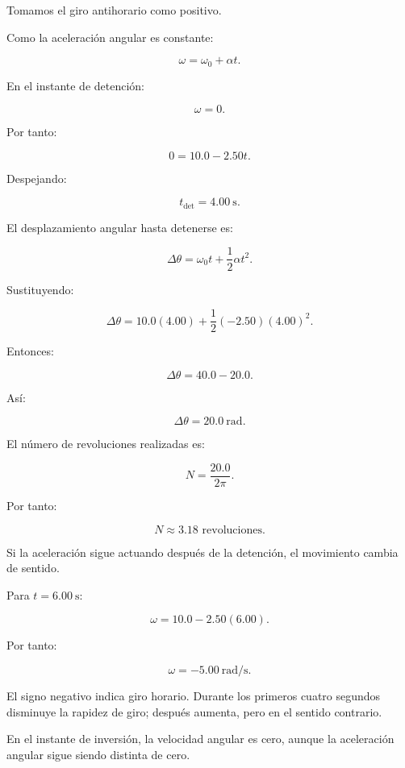 \begin{explicacion}
Tomamos el giro antihorario como positivo.

Como la aceleración angular es constante:

\[
\omega=\omega_0+\alpha t.
\]

En el instante de detención:

\[
\omega=0.
\]

Por tanto:

\[
0=10.0-2.50t.
\]

Despejando:

\[
\boxed{t_{\mathrm{det}}=\SI{4.00}{\second}}.
\]

El desplazamiento angular hasta detenerse es:

\[
\Delta\theta=\omega_0t+\frac12\alpha t^2.
\]

Sustituyendo:

\[
\Delta\theta
=10.0(4.00)+\frac12(-2.50)(4.00)^2.
\]

Entonces:

\[
\Delta\theta=40.0-20.0.
\]

Así:

\[
\boxed{\Delta\theta=\SI{20.0}{\radian}}.
\]

El número de revoluciones realizadas es:

\[
N=\frac{20.0}{2\pi}.
\]

Por tanto:

\[
\boxed{N\approx3.18\text{ revoluciones}}.
\]

Si la aceleración sigue actuando después de la detención,
el movimiento cambia de sentido.

Para \(t=\SI{6.00}{\second}\):

\[
\omega=10.0-2.50(6.00).
\]

Por tanto:

\[
\boxed{\omega=-\SI{5.00}{\radian\per\second}}.
\]

El signo negativo indica giro horario. Durante los primeros
cuatro segundos disminuye la rapidez de giro; después aumenta,
pero en el sentido contrario.

En el instante de inversión, la velocidad angular es cero,
aunque la aceleración angular sigue siendo distinta de cero.
\end{explicacion}


